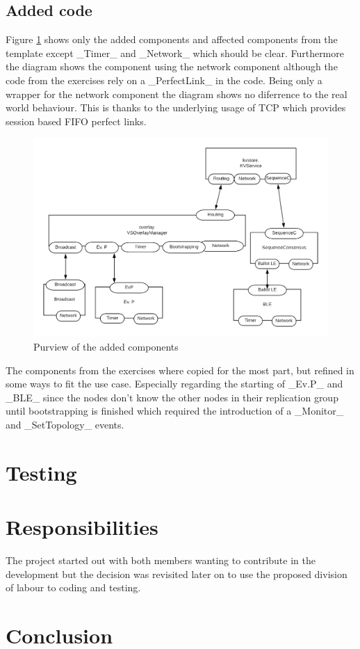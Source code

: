 \documentclass[a4paper]{scrartcl}
\begin{document}
\subsection{Added code}
Figure \ref{fig:modified} shows only the added components and affected components from the template except _Timer_ and _Network_ which should be clear.
Furthermore the diagram shows the component using the network component although the code from the exercises rely on a _PerfectLink_ in the code. 
Being only a wrapper  for the network component the diagram shows no diferrence to the real world behaviour.
This is thanks to the underlying usage of TCP which provides session based FIFO perfect links.

\begin{figure}[h!]
  \begin{center}
    \includegraphics[scale=0.4]{Modified.png}
    \caption{Purview of the added components}
    \label{fig:modified}
  \end{center}
\end{figure}

The components from the exercises where copied for the most part, but refined in some ways to fit the use case.
Especially regarding the starting of _Ev.P_ and _BLE_ since the nodes don't know the other nodes in their replication group until bootstrapping is finished which required the introduction of a _Monitor_ and _SetTopology_ events.


\section{Testing}


\section{Responsibilities}
The project started out with both members wanting to contribute in  the development but the decision was revisited later on to use the proposed division of labour to coding and testing.


\section{Conclusion}
\end{document}
